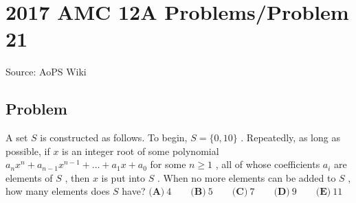 \documentclass[12pt]{article}
\begin{document}
\section*{{2017 AMC 12A Problems/Problem 21}}
Source: AoPS Wiki

\subsection*{Problem}
A set $S$ is constructed as follows. To begin, $S = \{0,10\}$ . Repeatedly, as long as possible, if $x$ is an integer root of some polynomial $a_{n}x^n + a_{n-1}x^{n-1} + \dots + a_{1}x + a_0$ for some $n\geq{1}$ , all of whose coefficients $a_i$ are elements of $S$ , then $x$ is put into $S$ . When no more elements can be added to $S$ , how many elements does $S$ have? $\textbf{(A)}\ 4 \qquad \textbf{(B)}\ 5 \qquad\textbf{(C)}\ 7 \qquad\textbf{(D)}\ 9 \qquad\textbf{(E)}\ 11$
\end{document}
